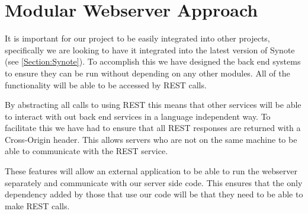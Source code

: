\section{Modular Webserver Approach}
\label{Section:Modular Approach}
It is important for our project to be easily integrated into other projects, specifically we are looking to have it integrated into the latest version of Synote (see \autoref{Section:Synote}). To accomplish this we have designed the back end systems to ensure they can be run without depending on any other modules. All of the functionality will be able to be accessed by \gls{REST} calls.

By abstracting all calls to using \gls{REST} this means that other services will be able to interact with out back end services in a language independent way. To facilitate this we have had to ensure that all \gls{REST} responses are returned with a Cross-Origin header. This allows servers who are not on the same machine to be able to communicate with the \gls{REST} service.

These features will allow an external application to be able to run the webserver separately and communicate with our server side code. This ensures that the only dependency added by those that use our code will be that they need to be able to make \gls{REST} calls.

